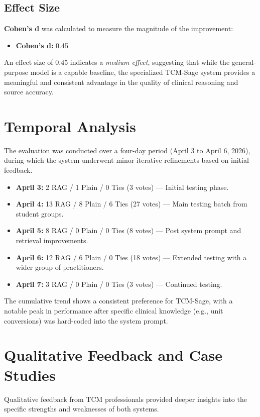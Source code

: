 \subsection{Effect Size}
\textbf{Cohen's d} was calculated to measure the magnitude of the improvement:
\begin{itemize}
    \item \textbf{Cohen's d:} 0.45
\end{itemize}
An effect size of 0.45 indicates a \textit{medium effect}, suggesting that while the general-purpose model is a capable baseline, the specialized TCM-Sage system provides a meaningful and consistent advantage in the quality of clinical reasoning and source accuracy.

\section{Temporal Analysis}

The evaluation was conducted over a four-day period (April 3 to April 6, 2026), during which the system underwent minor iterative refinements based on initial feedback.

\begin{itemize}
    \item \textbf{April 3:} 2 RAG / 1 Plain / 0 Ties (3 votes) --- Initial testing phase.
    \item \textbf{April 4:} 13 RAG / 8 Plain / 6 Ties (27 votes) --- Main testing batch from student groups.
    \item \textbf{April 5:} 8 RAG / 0 Plain / 0 Ties (8 votes) --- Post system prompt and retrieval improvements.
    \item \textbf{April 6:} 12 RAG / 6 Plain / 0 Ties (18 votes) --- Extended testing with a wider group of practitioners.
    \item \textbf{April 7:} 3 RAG / 0 Plain / 0 Ties (3 votes) --- Continued testing.
\end{itemize}

The cumulative trend shows a consistent preference for TCM-Sage, with a notable peak in performance after specific clinical knowledge (e.g., unit conversions) was hard-coded into the system prompt.

\section{Qualitative Feedback and Case Studies}

Qualitative feedback from TCM professionals provided deeper insights into the specific strengths and weaknesses of both systems.

